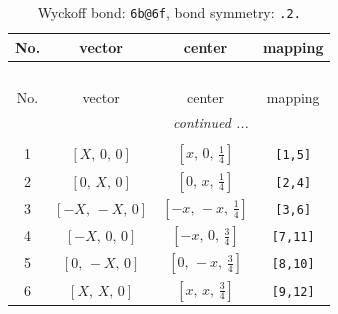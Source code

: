 \documentclass[fleqn,8pt]{jsarticle}
\begin{document}
\begin{longtable}{cccc}
\caption{Wyckoff bond: {\tt 6b@6f}, bond symmetry: {\tt .2.}}
 \\
 \hline \hline
No. & vector & center & mapping \\ \hline \endfirsthead

\multicolumn{3}{l}{\tablename\ \thetable{}} \\
 \hline \hline
No. & vector & center & mapping \\ \hline \endhead

 \hline \hline
\multicolumn{3}{r}{\footnotesize\it continued ...} \\ \endfoot

 \hline \hline
\multicolumn{3}{r}{} \\ \endlastfoot

1 & $\left[ X,\, 0,\, 0 \right]$ & $\left[ x,\, 0,\, \frac{1}{4} \right]$ & {\tt [1,5]} \\ \hline
2 & $\left[ 0,\, X,\, 0 \right]$ & $\left[ 0,\, x,\, \frac{1}{4} \right]$ & {\tt [2,4]} \\ \hline
3 & $\left[ - X,\, - X,\, 0 \right]$ & $\left[ - x,\, - x,\, \frac{1}{4} \right]$ & {\tt [3,6]} \\ \hline
4 & $\left[ - X,\, 0,\, 0 \right]$ & $\left[ - x,\, 0,\, \frac{3}{4} \right]$ & {\tt [7,11]} \\ \hline
5 & $\left[ 0,\, - X,\, 0 \right]$ & $\left[ 0,\, - x,\, \frac{3}{4} \right]$ & {\tt [8,10]} \\ \hline
6 & $\left[ X,\, X,\, 0 \right]$ & $\left[ x,\, x,\, \frac{3}{4} \right]$ & {\tt [9,12]} \\
\end{longtable}
\renewcommand{\arraystretch}{1.2}
\end{document}
